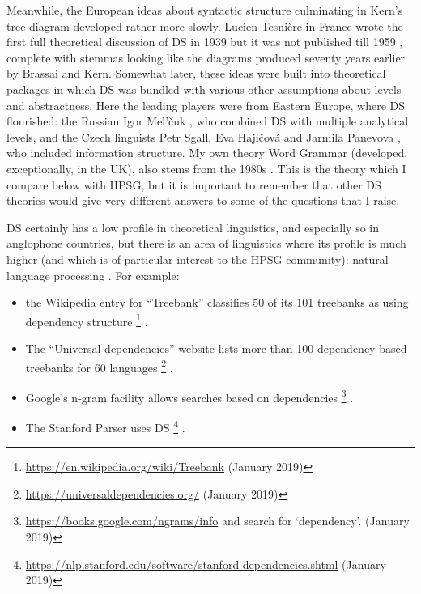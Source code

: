 \documentclass[output=paper]{langscibook}
\begin{document}
Meanwhile, the European ideas about syntactic structure culminating in Kern’s tree diagram developed rather more slowly. Lucien Tesnière in France wrote the first full theoretical discussion of DS in 1939 but it was not published till 1959 \citep{Tesniere59a-u,Tesniere2015a-u}, complete with stemmas looking like the diagrams produced seventy years earlier by Brassai and Kern. Somewhat later, these ideas were built into theoretical packages in which DS was bundled with various other assumptions about levels and abstractness. Here the leading players were from Eastern Europe, where DS flourished: the Russian Igor Mel’čuk \citep{Melcuk88a-u}, who combined DS with multiple analytical levels, and the Czech linguists Petr Sgall, Eva Hajičová and Jarmila Panevova \citep{Sgall&co1986}, who included information structure. My own theory Word Grammar (developed, exceptionally, in the UK), also stems from the 1980s \citep{Hudson84a-u,Hudson90a-u,Sugayama2002,Hudson2007a-u,Gisborne2008,Rosta2008,Gisborne2010,Hudson2010b-u,Gisborne2011,Duran-Eppler2011,TraugottTrousdale2013,Duran-Eppler&co2016,Hudson2016,Hudson2017,Hudson2017a,Gisborne2019}. This is the theory which I compare below with HPSG, but it is important to remember that other DS theories would give very different answers to some of the questions that I raise.

DS certainly has a low profile in theoretical linguistics, and especially so in anglophone countries, but there is an area of linguistics where its profile is much higher (and which is of particular interest to the HPSG community): natural-language processing \citep{KMcDN2009a-u}. For example:

\begin{itemize}
	\item the Wikipedia entry for ``Treebank'' classifies 50 of its 101 treebanks as using dependency structure%
	\footnote{\url{https://en.wikipedia.org/wiki/Treebank} (January 2019)}%
	.
	
	\item The ``Universal dependencies'' website lists more than 100 dependency-based treebanks for 60 languages%
	\footnote{\url{https://universaldependencies.org/} (January 2019)}%
	.
	
	\item Google’s n-gram facility allows searches based on dependencies%
	\footnote{\url{https://books.google.com/ngrams/info} and search for ‘dependency’. (January 2019)}%
	.
	
	\item The Stanford Parser \citep{ChenManning2014,deMarneffe&co2014} uses DS%
	\footnote{\url{https://nlp.stanford.edu/software/stanford-dependencies.shtml} (January 2019)}%
	.
\end{itemize}
\end{document}
